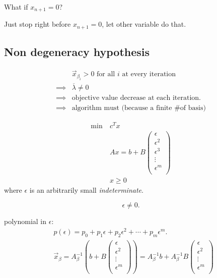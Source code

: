 \begin{problem}
What if \(x_{n+1} = 0\)?
\end{problem}
\begin{intuition}
	Just stop right before \(x_{n+1} = 0\), let other variable do that.
\end{intuition}

\subsection{Non degeneracy hypothesis}
\[
	\begin{split}
		&\vec{x}_{\beta_i} > 0 \text{ for all \(i\) at every iteration}\\
		\implies &\overline{\lambda} \neq 0\\
		\implies &\text{objective value decrease at each iteration.}\\
		\implies &\text{algorithm must (because a finite \# of basis)}
	\end{split}
\]

\begin{align*}
	\min~ & c^T x                                \\
	      & Ax = b + B\begin{pmatrix}
		\epsilon   \\
		\epsilon^2 \\
		\epsilon^3 \\
		\vdots     \\
		\epsilon^m \\
	\end{pmatrix} \\
	      & x\geq 0
\end{align*}
where \(\epsilon \) is an arbitrarily small \emph{indeterminate}.
\begin{remark}
	\[
		\epsilon \neq 0.
	\]
\end{remark}

\begin{observe}
	polynomial in \(\epsilon \):
	\[
		\begin{split}
			&p(\epsilon) = p_0 + p_1\epsilon + p_2 \epsilon^2 + \cdots + p_{m}\epsilon^m.	\\
			&\vec{x}_{\beta} = A^{-1}_{\beta}\left(b + B\begin{pmatrix}
					\epsilon   \\
					\epsilon^2 \\
					\vdots     \\
					\epsilon^m \\
				\end{pmatrix}\right) = A^{-1}_{\beta}b + A^{-1}_{\beta}B\begin{pmatrix}
				\epsilon   \\
				\epsilon^2 \\
				\vdots     \\
				\epsilon^m \\
			\end{pmatrix}
		\end{split}
	\]
\end{observe}

